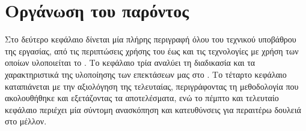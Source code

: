 \section{Οργάνωση του παρόντος}
Στο δεύτερο κεφάλαιο δίνεται μία πλήρης περιγραφή όλου του τεχνικού υποβάθρου
της εργασίας, από τις περιπτώσεις χρήσης του  έως και τις τεχνολογίες
με χρήση των οποίων υλοποιείται το \viofs{}. Το κεφάλαιο τρία αναλύει τη
διαδικασία και τα χαρακτηριστικά της υλοποίησης των επεκτάσεων μας στο \osv{}.
Το τέταρτο κεφάλαιο καταπιάνεται με την αξιολόγηση της τελευταίας, περιγράφοντας
τη μεθοδολογία που ακολουθήθηκε και εξετάζοντας τα αποτελέσματα, ενώ το πέμπτο
και τελευταίο κεφάλαιο περιέχει μία σύντομη ανασκόπηση και κατευθύνσεις για
περαιτέρω δουλειά στο μέλλον.
